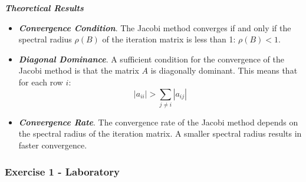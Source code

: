 \begin{enumerate}[label=\textcolor{Green3}{\textbf{\arabic*.}}]
    \textbf{\emph{Theoretical Results}}
    \begin{itemize}
        \item \textbf{\emph{Convergence Condition}}. The Jacobi method converges if and only if the spectral radius $\rho(B)$ of the iteration matrix is less than 1: $\rho\left(B\right) < 1$.
        
        \item \textbf{\emph{Diagonal Dominance}}. A sufficient condition for the convergence of the Jacobi method is that the matrix $A$ is diagonally dominant. This means that for each row $i$:
        \begin{equation*}
            |a_{ii}| > \sum_{j \neq i} |a_{ij}|
        \end{equation*}

        \item \textbf{\emph{Convergence Rate}}. The convergence rate of the Jacobi method depends on the spectral radius of the iteration matrix. A smaller spectral radius results in faster convergence.
    \end{itemize}
\end{enumerate}


\newpage

\subsubsection*{Exercise 1 - Laboratory}

